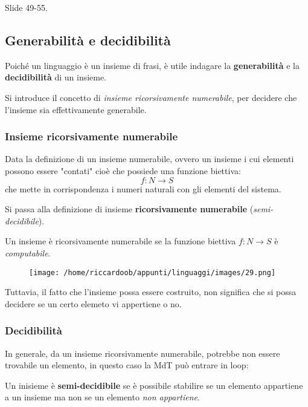 Slide 49-55.

\subsection{Generabilità e decidibilità}
Poiché un linguaggio è un insieme di frasi, è utile indagare la \textbf{generabilità} e la \textbf{decidibilità} di un insieme.

Si introduce il concetto di \textit{insieme ricorsivamente numerabile}, per decidere che l'insieme sia effettivamente generabile.

\subsubsection{Insieme ricorsivamente numerabile}
Data la definizione di un insieme numerabile, ovvero un insieme i cui elementi possono essere "contati" cioè che possiede una funzione biettiva:
\begin{equation*}
    f: N \rightarrow S
\end{equation*}
che mette in corrispondenza i numeri naturali con gli elementi del sistema.

Si passa alla definizione di insieme \textbf{ricorsivamente numerabile} (\textit{semi-decidibile}). 
\begin{mdframed}[topline=false,bottomline=false,rightline=false]
    Un insieme è ricorsivamente numerabile se la funzione biettiva $f: N \rightarrow S$ è \textit{computabile}.
\end{mdframed}
\begin{figure}[H]
    \centering
    \texttt{[image: /home/riccardoob/appunti/linguaggi/images/29.png]}
\end{figure}
Tuttavia, il fatto che l'insieme possa essere costruito, non significa che si possa decidere se un certo elemeto vi appertiene o no.

\subsubsection{Decidibilità}
In generale, da un insieme ricorsivamente numerabile, potrebbe non essere trovabile un elemento, in questo caso la MdT può entrare in loop:
\begin{mdframed}[topline=false,bottomline=false,rightline=false]
    Un inisieme è \textbf{semi-decidibile} se è possibile stabilire se un elemento appartiene a un insieme ma non se un elemento \textit{non appartiene}.
\end{mdframed}

